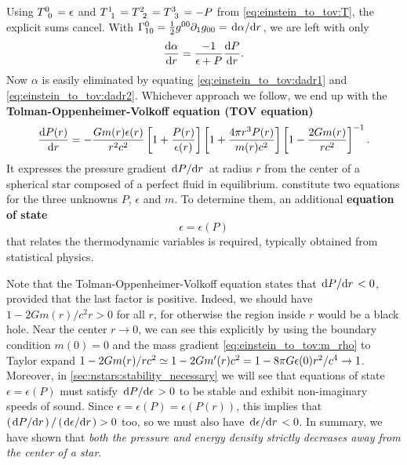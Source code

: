 Using $T\indices{^0_0} = \epsilon$ and $T\indices{^1_1} = T\indices{^2_2} = T\indices{^3_3} = -P$ from \cref{eq:einstein_to_tov:T}, the explicit sums cancel.
With $\Gamma^0_{10} = \frac12 g^{00} \partial_1 g_{00} = \odv{\alpha}/{r}$, we are left with only
\begin{equation}
	\odv{\alpha}{r} = \frac{-1}{\epsilon+P} \odv{P}{r} .
	\label{eq:einstein_to_tov:dadr2}
\end{equation}
Now $\alpha$ is easily eliminated by equating \eqref{eq:einstein_to_tov:dadr1} and \eqref{eq:einstein_to_tov:dadr2}. 
Whichever approach we follow, we end up with the \textbf{Tolman-Oppenheimer-Volkoff equation (TOV equation)}
\begin{equation}
	\odv{P(r)}{r} = -\frac{G m(r) \epsilon(r)}{r^2 c^2} \left[ 1 + \frac{P(r)}{\epsilon(r)} \right] \left[ 1 + \frac{4 \pi r^3 P(r)}{m(r) c^2} \right] \left[ 1 - \frac{2 G m(r)}{r c^2} \right]^{-1} .
	\label{eq:tov}
\end{equation}
It expresses the pressure gradient $\odv{P}/{r}$ at radius $r$ from the center of a spherical star composed of a perfect fluid in equilibrium.
 constitute two equations for the three unknowns $P$, $\epsilon$ and $m$.
To determine them, an additional \textbf{equation of state}
\begin{equation}
	\epsilon = \epsilon(P)
\label{eq:tov:eos}
\end{equation}
that relates the thermodynamic variables is required, typically obtained from statistical physics.

Note that the Tolman-Oppenheimer-Volkoff equation states that $\odv{P}/{r} < 0$, provided that the last factor is positive.
Indeed, we should have $1 - 2 G m(r) / c^2 r > 0$ for all $r$, for otherwise the region inside $r$ would be a black hole.
Near the center $r \rightarrow 0$, we can see this explicitly by using the boundary condition $m(0)=0$ and the mass gradient \eqref{eq:einstein_to_tov:m_rho} to Taylor expand $1 - 2 G m(r) / r c^2 \simeq 1 - 2 G m'(r) c^2 = 1 - 8 \pi G \epsilon(0) r^2 / c^4 \rightarrow 1$.
Moreover, in \cref{sec:nstars:stability_necessary} we will see that equations of state $\epsilon = \epsilon(P)$ must satisfy $\odv{P}/{\epsilon} > 0$ to be stable and exhibit non-imaginary speeds of sound.
Since $\epsilon = \epsilon(P) = \epsilon(P(r))$, this implies that $\left( \odv{P}/{r} \right) / \left( \odv{\epsilon}/{r} \right) > 0$ too, so we must also have $\odv{\epsilon}/{r} < 0$.
In summary, we have shown that \emph{both the pressure and energy density strictly decreases away from the center of a star}.


